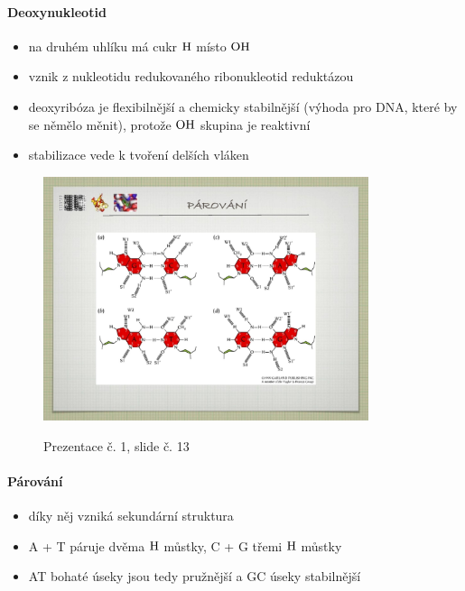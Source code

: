 \documentclass[DIV=8]{scrreprt}
\begin{document}
\paragraph{Deoxynukleotid}
\begin{itemize}[nosep]
    \item na druhém uhlíku má cukr \(\ce{H}\) místo \(\ce{OH}\)
    \item vznik z nukleotidu redukovaného ribonukleotid reduktázou
    \item deoxyribóza je flexibilnější a chemicky stabilnější (výhoda pro DNA, které by se němělo měnit), protože \(\ce{OH}\) skupina je reaktivní
    \item stabilizace vede k tvoření delších vláken
\end{itemize}



\begin{figure}
    \caption{Prezentace č. 1, slide č. 13}
    \includegraphics[width=0.85\textwidth]{slides-1/slide-13.jpg}
    \centering
    \label{slides-1-slide-13}
\end{figure}

\paragraph{Párování}
\begin{itemize}[nosep]
    \item díky něj vzniká sekundární struktura
    \item A + T páruje dvěma \(\ce{H}\) můstky, C + G třemi \(\ce{H}\) můstky
    \item AT bohaté úseky jsou tedy pružnější a GC úseky stabilnější
\end{itemize}
\end{document}
